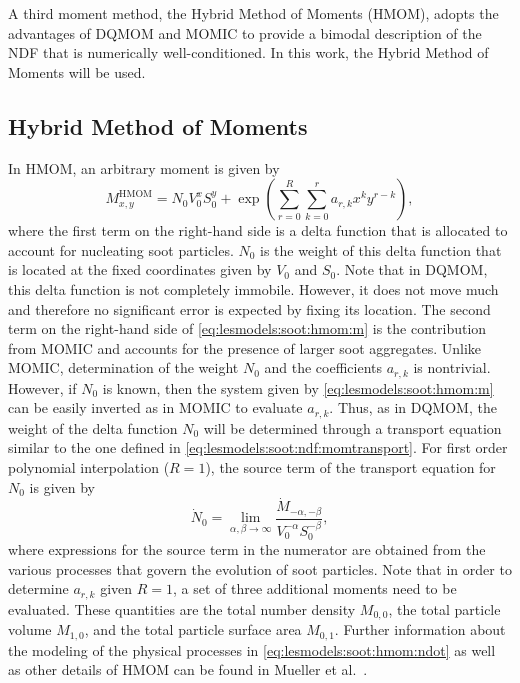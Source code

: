 A third moment method, the Hybrid Method of Moments (HMOM), adopts the advantages of DQMOM and MOMIC to provide a bimodal description of the NDF that is numerically well-conditioned. In this work, the Hybrid Method of Moments will be used.


\subsection{Hybrid Method of Moments}
\label{sec:lesmodels:soot:hmom}

In HMOM, an arbitrary moment is given by
\begin{equation}\label{eq:lesmodels:soot:hmom:m}
  M_{x,y}^{\text{HMOM}} = N_0 V_0^x S_0^y + \exp\left( \sum\limits_{r=0}^{R} \sum\limits_{k=0}^{r} a_{r,k}x^k y^{r-k} \right),
\end{equation}
where the first term on the right-hand side is a delta function that is allocated to account for nucleating soot particles. $N_0$ is the weight of this delta function that is located at the fixed coordinates given by $V_0$ and $S_0$. Note that in DQMOM, this delta function is not completely immobile. However, it does not move much and therefore no significant error is expected by fixing its location. The second term on the right-hand side of \cref{eq:lesmodels:soot:hmom:m} is the contribution from MOMIC and accounts for the presence of larger soot aggregates. Unlike MOMIC, determination of the weight $N_0$ and the coefficients $a_{r,k}$ is nontrivial. However, if $N_0$ is known, then the system given by \cref{eq:lesmodels:soot:hmom:m} can be easily inverted as in MOMIC to evaluate $a_{r,k}$. Thus, as in DQMOM, the weight of the delta function $N_0$ will be determined through a transport equation similar to the one defined in \cref{eq:lesmodels:soot:ndf:momtransport}. For first order polynomial interpolation ($R = 1$), the source term of the transport equation for $N_0$ is given by
\begin{equation}\label{eq:lesmodels:soot:hmom:ndot}
  \dot{N}_0 = \lim_{\alpha,\beta\to\infty} \frac{\dot{M}_{-\alpha,-\beta}}{V_0^{-\alpha} S_0^{-\beta}},
\end{equation}
where expressions for the source term in the numerator are obtained from the various processes that govern the evolution of soot particles. Note that in order to determine $a_{r,k}$ given $R = 1$, a set of three additional moments need to be evaluated. These quantities are the total number density $M_{0,0}$, the total particle volume $M_{1,0}$, and the total particle surface area $M_{0,1}$. Further information about the modeling of the physical processes in \cref{eq:lesmodels:soot:hmom:ndot} as well as other details of HMOM can be found in Mueller et al.~\cite{hmom2009,mueller2009,mueller2011}.

